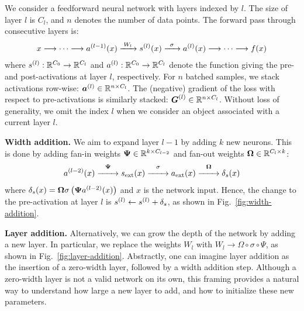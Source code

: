 
We consider a feedforward neural network with layers indexed by $l$. The size of layer $l$ is $C_l$, and $n$ denotes the number of data points. The forward pass through consecutive layers is:
\begin{align}
    x \longrightarrow \dots \longrightarrow \postact[l-1](x) \xrightarrow{\;W_l\;} \preact[l](x) \xrightarrow{\;\;\sigma\;\;} \postact[l](x)  \longrightarrow \dots \longrightarrow f(x)
\end{align}
where $\preact[l]: \mathbb{R}^{C_0} \to \mathbb{R}^{C_l}$ and $\postact[l]: \mathbb{R}^{C_0} \to \mathbb{R}^{C_l}$ denote the function giving the pre- and post-activations at layer $l$, respectively.
For $n$ batched samples, we stack activations row-wise: $\Postact[l] \in \mathbb{R}^{n \times C_l}$. The (negative) gradient of the loss with respect to pre-activations is similarly stacked: $\Gradpreact^{(l)} \in \mathbb{R}^{n \times C_{l}}$.
Without loss of generality, we omit the index $l$ when we consider an object associated with a current layer $l$.

\textbf{Width addition.} We aim to expand layer $l-1$ by adding $k$ new neurons. This is done by adding fan-in weights $\Fanin \in \mathbb{R}^{k \times C_{l-2}}$ and fan-out weights $\Fanout \in \mathbb{R}^{C_l \times k}$:
\begin{align}
    \postact[l-2](x) \overset{\Fanin}{\xrightarrow{\hspace{2em}}} \preactext(x) \overset{\sigma}{\xrightarrow{\hspace{2em}}} \postactext(x) \overset{\Fanout}{\xrightarrow{\hspace{2em}}} \deltas(x)
\end{align}
where $\deltas(x) =  \Fanout \sigma \left(\Fanin \postact[l-2](x) \right)$ and $x$ is the network input.
Hence, the change to the pre-activation at layer $l$ is $\preact[l] \leftarrow \preact[l] + \deltas$, as shown in Fig.~\ref{fig:width-addition}.

\textbf{Layer addition.} Alternatively, we can grow the depth of the network by adding a new layer. In particular, we replace the weights $W_l$ with $W_l \to \Omega \circ \sigma \circ \Psi$, as shown in Fig.~\ref{fig:layer-addition}. Abstractly, one can imagine layer addition as the insertion of a zero-width layer, followed by a width addition step. Although a zero-width layer is not a valid network on its own, this framing provides a natural way to understand how large a new layer to add, and how to initialize these new parameters.

